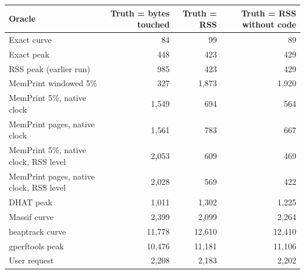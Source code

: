 \begin{tabular}{lrrr}
\toprule
Oracle & Truth = bytes touched & Truth = RSS & Truth = RSS without code \\
\midrule
Exact curve & 84 & 99 & 89 \\
Exact peak & 448 & 423 & 429 \\
RSS peak (earlier run) & 985 & 423 & 429 \\
MemPrint windowed 5\% & 327 & 1{,}873 & 1{,}920 \\
MemPrint 5\%, native clock & 1{,}549 & 694 & 564 \\
MemPrint pages, native clock & 1{,}561 & 783 & 667 \\
MemPrint 5\%, native clock, RSS level & 2{,}053 & 609 & 469 \\
MemPrint pages, native clock, RSS level & 2{,}028 & 569 & 422 \\
DHAT peak & 1{,}011 & 1{,}302 & 1{,}225 \\
Massif curve & 2{,}399 & 2{,}099 & 2{,}264 \\
heaptrack curve & 11{,}778 & 12{,}610 & 12{,}410 \\
gperftools peak & 10{,}476 & 11{,}181 & 11{,}106 \\
User request & 2{,}208 & 2{,}183 & 2{,}202 \\
\bottomrule
\end{tabular}
